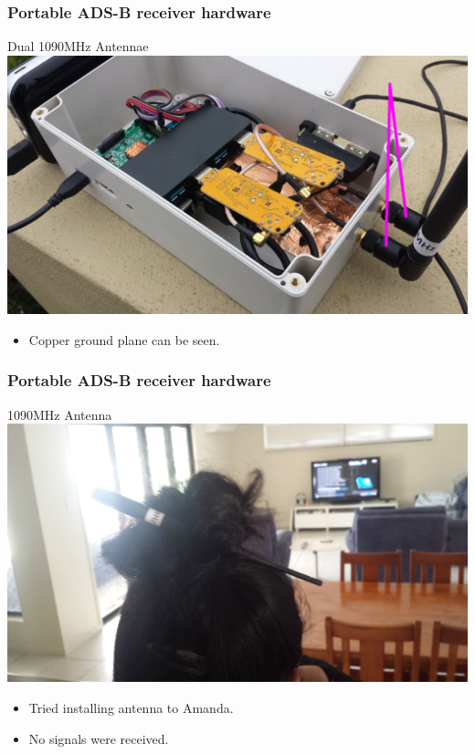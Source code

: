 \begin{frame}
\frametitle{Portable ADS-B receiver hardware}
\begin{block}{Dual 1090MHz Antennae}
\includegraphics[height=0.5\textheight]{image/adsb-hardware-antennae.png}
\begin{itemize}
\item Copper ground plane can be seen.
\end{itemize}
\end{block}
\end{frame}

\begin{frame}
\frametitle{Portable ADS-B receiver hardware}
\begin{block}{1090MHz Antenna}
\includegraphics[height=0.4\textheight]{image/adsb-amanda.png}
\begin{itemize}
\item<1-> Tried installing antenna to Amanda.
\item<2-> No signals were received.
\end{itemize}
\end{block}
\end{frame}

